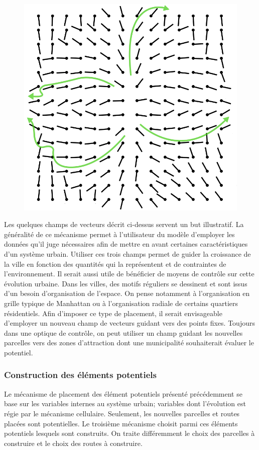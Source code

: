 \documentclass[12pt]{article}
\begin{document}
\begin{figure}[H]
  \centering
  \includegraphics[width=.8\linewidth]{images/vf-sum.png}
  \caption{}
  \label{fig:field-sum}
\end{figure}

Les quelques champs de vecteurs décrit ci-dessus servent un but
illustratif. La généralité de ce mécanisme permet à l'utilisateur du
modèle d'employer les données qu'il juge nécessaires afin de mettre en
avant certaines caractéristiques d'un système urbain. Utiliser ces
trois champs permet de guider la croissance de la ville en fonction
des quantités qui la représentent et de contraintes de
l'environnement. Il serait aussi utile de bénéficier de moyens de
contrôle sur cette évolution urbaine. Dans les villes, des motifs
réguliers se dessinent et sont issus d'un besoin d'organisation de
l'espace. On pense notamment à l'organisation en grille typique de
Manhattan ou à l'organisation radiale de certains quartiers
résidentiels. Afin d'imposer ce type de placement, il serait
envisageable d'employer un nouveau champ de vecteurs guidant vers des
points fixes. Toujours dans une optique de contrôle, on peut utiliser
un champ guidant les nouvelles parcelles vers des zones d'attraction
dont une municipalité souhaiterait évaluer le potentiel.

\subsubsection{Construction des éléments potentiels}

Le mécanisme de placement des élément potentiels présenté précédemment
se base sur les variables internes au système urbain; variables dont
l'évolution est régie par le mécanisme cellulaire. Seulement, les
nouvelles parcelles et routes placées sont potentielles. Le troisième
mécanisme choisit parmi ces éléments potentiels lesquels sont
construits. On traite différemment le choix des parcelles à construire
et le choix des routes à construire.
\end{document}

